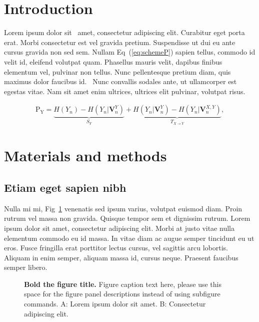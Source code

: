 \documentclass[10pt,letterpaper]{article}
\begin{document}
\linenumbers

\section*{Introduction}
Lorem ipsum dolor sit~\cite{bib1} amet, consectetur adipiscing elit. Curabitur eget porta erat. Morbi consectetur est vel gravida pretium. Suspendisse ut dui eu ante cursus gravida non sed sem. Nullam Eq~(\ref{eq:schemeP}) sapien tellus, commodo id velit id, eleifend volutpat quam. Phasellus mauris velit, dapibus finibus elementum vel, pulvinar non tellus. Nunc pellentesque pretium diam, quis maximus dolor faucibus id.~\cite{bib2} Nunc convallis sodales ante, ut ullamcorper est egestas vitae. Nam sit amet enim ultrices, ultrices elit pulvinar, volutpat risus.

\begin{eqnarray}
\label{eq:schemeP}
	\mathrm{P_Y} = \underbrace{H(Y_n) - H(Y_n|\mathbf{V}^{Y}_{n})}_{S_Y} + \underbrace{H(Y_n|\mathbf{V}^{Y}_{n})- H(Y_n|\mathbf{V}^{X,Y}_{n})}_{T_{X\rightarrow Y}},
\end{eqnarray}

\section*{Materials and methods}
\subsection*{Etiam eget sapien nibh}

Nulla mi mi, Fig~\ref{fig1} venenatis sed ipsum varius, volutpat euismod diam. Proin rutrum vel massa non gravida. Quisque tempor sem et dignissim rutrum. Lorem ipsum dolor sit amet, consectetur adipiscing elit. Morbi at justo vitae nulla elementum commodo eu id massa. In vitae diam ac augue semper tincidunt eu ut eros. Fusce fringilla erat porttitor lectus cursus,  vel sagittis arcu lobortis. Aliquam in enim semper, aliquam massa id, cursus neque. Praesent faucibus semper libero.

\begin{figure}[!h]
\caption{{\bf Bold the figure title.}
Figure caption text here, please use this space for the figure panel descriptions instead of using subfigure commands. A: Lorem ipsum dolor sit amet. B: Consectetur adipiscing elit.}
\label{fig1}
\end{figure}
\end{document}
